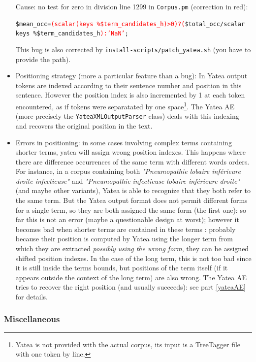 \documentclass{article}
\begin{document}
\begin{itemize}
Cause: no test for zero in division line 1299 in {\tt Corpus.pm} (correction in red):

\verb+$mean_occ=+{\tt\textcolor{red}{(scalar(keys \%\$term\_candidates\_h)>0)?(}}\verb+$total_occ/scalar keys %$term_candidates_h+{\tt\textcolor{red}{):'NaN'};}

This bug is also corrected by {\tt install-scripts/patch\_yatea.sh} (you have to provide the path).

\item Positioning strategy (more a particular feature than a bug): In Yatea output tokens are indexed according to their sentence number and position in this sentence. However the position index is also incremented by 1 at each token encountered, as if tokens were separatated by one space\footnote{Yatea is not provided with the actual corpus, its input is a TreeTagger file with one token by line.}. The Yatea AE (more precisely the {\tt YateaXMLOutputParser} class) deals with this indexing and recovers the original position in the text.

\item Errors in positioning: in some cases involving complex terms containing shorter terms, yatea will assign wrong position indexes. This happens where there are difference occurrences of the same term with different words orders. For instance, in a corpus containing both {\em "Pneumopathie lobaire inférieure droite infectieuse"}  and {\em "Pneumopathie infectieuse lobaire inférieure droite"} (and maybe other variants), Yatea is able to recognize that they both refer to the same term. But the Yatea output format does not permit different forms for a single term, so they are both assigned the same form (the first one): so far this is not an error (maybe a questionable design at worst); however it becomes bad when shorter terms are contained in these terms : probably because their position is computed by Yatea using the longer term from which they are extracted {\em possibly using the wrong form}, they can be assigned shifted position indexes. In the case of the long term, this is not too bad since it is still inside the terms bounds, but positions of the term itself (if it appears outside the context of the long term) are also wrong. The Yatea AE tries to recover the right position (and usually succeeds): see part \ref{yateaAE} for details.

\end{itemize}

\subsubsection{Miscellaneous}
\end{document}

